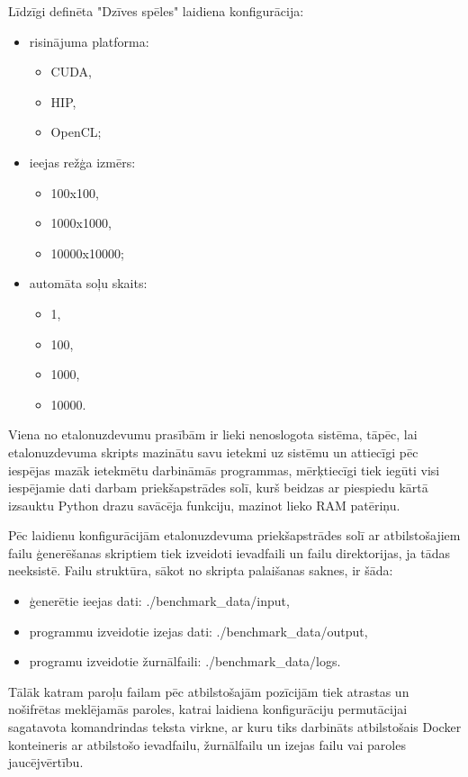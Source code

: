 Līdzīgi definēta "Dzīves spēles" laidiena konfigurācija:
\begin{itemize}
    \item risinājuma platforma:
    \begin{itemize}
        \item CUDA,
        \item HIP,
        \item OpenCL;
    \end{itemize}
    \item ieejas režģa izmērs:
    \begin{itemize}
        \item 100x100,
        \item 1000x1000,
        \item 10000x10000;
    \end{itemize}
    \item automāta soļu skaits:
    \begin{itemize}
        \item 1,
        \item 100,
        \item 1000,
        \item 10000.
    \end{itemize}
\end{itemize}

Viena no etalonuzdevumu prasībām ir lieki nenoslogota sistēma, tāpēc, lai
etalonuzdevuma skripts mazinātu savu ietekmi uz sistēmu un attiecīgi
pēc iespējas mazāk ietekmētu darbināmās programmas, mērķtiecīgi tiek iegūti visi
iespējamie dati darbam priekšapstrādes solī, kurš beidzas ar piespiedu kārtā 
izsauktu Python drazu savācēja funkciju, mazinot lieko RAM patēriņu.

Pēc laidienu konfigurācijām etalonuzdevuma priekšapstrādes solī ar
atbilstošajiem failu ģenerēšanas skriptiem tiek izveidoti ievadfaili un failu
direktorijas, ja tādas neeksistē. Failu struktūra, sākot no skripta palaišanas
saknes, ir šāda:
\begin{itemize}
    \item ģenerētie ieejas dati: ./benchmark\_data/input,
    \item programmu izveidotie izejas dati: ./benchmark\_data/output,
    \item programu izveidotie žurnālfaili: ./benchmark\_data/logs.
\end{itemize}
Tālāk katram paroļu failam pēc atbilstošajām pozīcijām tiek atrastas un
nošifrētas meklējamās paroles, katrai laidiena konfigurāciju permutācijai
sagatavota komandrindas teksta virkne, ar kuru tiks darbināts atbilstošais
Docker konteineris ar atbilstošo ievadfailu, žurnālfailu un izejas failu vai
paroles jaucējvērtību.

